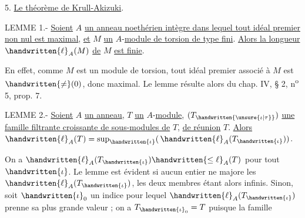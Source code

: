 5. \uline{Le théorème de Krull-Akizuki}.

LEMME 1.- \uline{Soient} $A$ \uline{un anneau noethérien intègre dans lequel tout idéal premier non nul est maximal}, \uline{et} $M$ \uline{un} $A$-\uline{module de torsion de type fini}. \uline{Alors la longueur} $\handwritten{\ell}_A(M)$ \uline{de} $M$ \uline{est finie}.

En effet, comme $M$ est un module de torsion, tout idéal premier associé à $M$ est $\handwritten{\ne}(0)$, donc maximal. Le lemme résulte alors du chap. IV, § 2, n\textsuperscript{o} 5, prop. 7.

LEMME 2.- \uline{Soient} $A$ \uline{un anneau}, $T$ \uline{un} $A$-\uline{module}, $(T_{\handwritten{\unsure{\iota|\tau}}})$ \uline{une famille filtrante croissante de sous-modules de} $T$, \uline{de réunion} $T$. \uline{Alors} $\handwritten{\ell}_A(T)=\sup_{\handwritten{\iota}}(\,\handwritten{\ell}_A(T_{\handwritten{\iota}}))$.

On a $\handwritten{\ell}_A(T_{\handwritten{\iota}})\handwritten{\leq\ell}_A(T)$ pour tout $\handwritten{\iota}$. Le lemme est évident si aucun entier ne majore les $\handwritten{\ell}_A(T_{\handwritten{\iota}})$, les deux membres étant alors infinis. Sinon, soit $\handwritten{\iota}_0$ un indice pour lequel $\handwritten{\ell}_A(T_{\handwritten{\iota}})$ prenne sa plus grande valeur ; on a $T_{\handwritten{\iota}_0}=T$ puisque la famille
